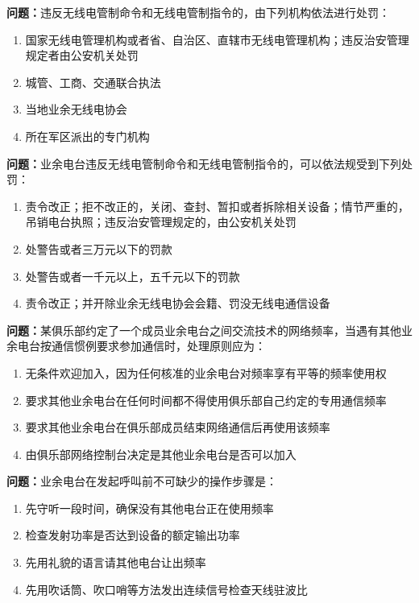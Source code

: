 \documentclass[UTF8]{ctexbook}
\begin{document}
\textbf{问题：}违反无线电管制命令和无线电管制指令的，由下列机构依法进行处罚：
\begin{enumerate}[label=\Alph*), leftmargin=3em]
  \item 国家无线电管理机构或者省、自治区、直辖市无线电管理机构；违反治安管理规定者由公安机关处罚
  \item 城管、工商、交通联合执法
  \item 当地业余无线电协会
  \item 所在军区派出的专门机构
\end{enumerate}

\textbf{问题：}业余电台违反无线电管制命令和无线电管制指令的，可以依法规受到下列处罚：
\begin{enumerate}[label=\Alph*), leftmargin=3em]
  \item  责令改正；拒不改正的，关闭、查封、暂扣或者拆除相关设备；情节严重的，吊销电台执照；违反治安管理规定的，由公安机关处罚
  \item  处警告或者三万元以下的罚款
  \item  处警告或者一千元以上，五千元以下的罚款
  \item  责令改正；并开除业余无线电协会会籍、罚没无线电通信设备
\end{enumerate}

\textbf{问题：}某俱乐部约定了一个成员业余电台之间交流技术的网络频率，当遇有其他业余电台按通信惯例要求参加通信时，处理原则应为：
\begin{enumerate}[label=\Alph*), leftmargin=3em]
  \item 无条件欢迎加入，因为任何核准的业余电台对频率享有平等的频率使用权
  \item 要求其他业余电台在任何时间都不得使用俱乐部自己约定的专用通信频率
  \item 要求其他业余电台在俱乐部成员结束网络通信后再使用该频率
  \item 由俱乐部网络控制台决定是其他业余电台是否可以加入
\end{enumerate}

\textbf{问题：}业余电台在发起呼叫前不可缺少的操作步骤是：
\begin{enumerate}[label=\Alph*), leftmargin=3em]
  \item 先守听一段时间，确保没有其他电台正在使用频率
  \item 检查发射功率是否达到设备的额定输出功率
  \item 先用礼貌的语言请其他电台让出频率
  \item 先用吹话筒、吹口哨等方法发出连续信号检查天线驻波比
\end{enumerate}
\end{document}
